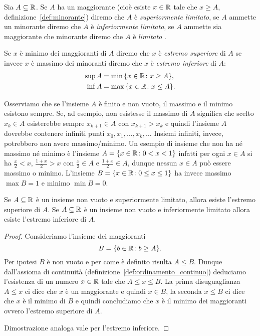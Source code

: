 \begin{definition}%
  \mymark{***}%
  Sia $A \subseteq {\mathbb R}$.
  Se $A$ ha un maggiorante (cioè esiste $x\in {\mathbb R}$ tale che 
  $x\ge A$, definizione~\ref{def:minorante})
  diremo che $A$ è \emph{superiormente limitato},
  se $A$ ammette un minorante diremo che $A$ è \emph{inferiormente limitato},
  se $A$ ammette sia maggiorante che minorante diremo che $A$ è 
  \emph{limitato}%
%
.
  
  Se $x$ è minimo dei maggioranti di $A$ diremo che $x$ è
  \emph{estremo superiore}%
%
  di $A$ se invece $x$ è massimo dei minoranti diremo che $x$ è
  \emph{estremo inferiore}%
%
 di $A$:
  \begin{align*}
  \sup A &= \min {\left\{ x\in {\mathbb R}\colon x\ge A \right\}}, \\
  \inf A &= \max {\left\{ x\in {\mathbb R}\colon x \le A \right\}}.
  \end{align*}
  \index{$\sup$}%
  \index{$\inf$}%
\end{definition}

Osserviamo che se l'insieme $A$ è finito e non vuoto,
il massimo e il minimo esistono sempre.
Se, ad esempio, non esistesse il massimo di $A$ significa che scelto
$x_k\in A$ esisterebbe sempre $x_{k+1}\in A$ con $x_{k+1} > x_k$ e quindi l'insieme
$A$ dovrebbe contenere infiniti punti $x_0,x_1, \dots, x_k,\dots $
Insiemi infiniti, invece, potrebbero non avere massimo/minimo.
Un esempio di insieme che non ha né massimo né minimo è
l'insieme $A = {\left\{ x\in {\mathbb R}\colon 0<x<1 \right\}}$ infatti per ogni
$x\in A$ si ha $\frac x 2<x$, $\frac{1+x}{2}>x$
con $\frac x 2\in A$ e $\frac{1+x}{2}\in A$,
dunque nessun $x\in A$ può essere
massimo o minimo. L'insieme $B={\left\{ x\in {\mathbb R} \colon 0\le x \le 1 \right\}}$
ha invece massimo $\max B= 1$ e minimo $\min B=0$.

\begin{theorem}%
  \label{th:sup}%
  \mymark{**}%
  Se $A\subseteq {\mathbb R}$ è un insieme non vuoto
  e superiormente limitato, allora esiste l'estremo superiore di $A$.
  Se $A\subseteq {\mathbb R}$ è un insieme non vuoto e inferiormente limitato 
  allora esiste l'estremo inferiore di $A$.
  \end{theorem}
  \begin{proof}
  \mymark{*}
  Consideriamo l'insieme dei maggioranti
  \[
  B = {\left\{  b\in {\mathbb R} \colon b \ge A \right\}}.
  \]
  Per ipotesi $B$ è non vuoto e per come è definito risulta $A\le B$.
  Dunque dall'assioma di continuità (definizione~\ref{def:ordinamento_continuo}) 
  deduciamo l'esistenza di un numero $x\in {\mathbb R}$
  tale che $A\le x \le B$. La prima disuguaglianza $A\le x$ ci dice che $x$ è un
  maggiorante e quindi $x\in B$, la seconda $x\le B$ ci dice che $x$ è il minimo
  di $B$ e quindi concludiamo che $x$ è il minimo dei maggioranti 
  ovvero l'estremo superiore di $A$.

  Dimostrazione analoga vale per l'estremo inferiore.
\end{proof}

